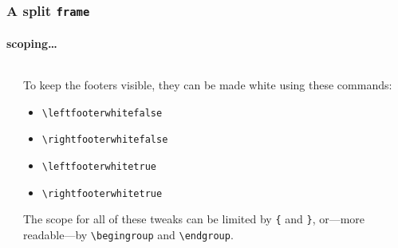 \begin{frame}%
  \frametitle{A split \texttt{frame}}%
  \framesubtitle{scoping\ldots}%
  \begin{columns}[T]
    \begin{textcolumn}
    \end{textcolumn}
    \begin{textcolumn}
      To keep the footers visible, they can be made white using these commands:
      \begin{itemize}
        \item \texttt{\textbackslash leftfooterwhitefalse}
        \item \texttt{\textbackslash rightfooterwhitefalse}
        \item \texttt{\textbackslash leftfooterwhitetrue}
        \item \texttt{\textbackslash rightfooterwhitetrue}
      \end{itemize}
      
      The scope for all of these tweaks can be limited by \texttt{\{} and \texttt{\}},
      or---more readable---by \texttt{\textbackslash begingroup} and \texttt{\textbackslash endgroup}.
    \end{textcolumn}
  \end{columns}
\end{frame}


\setlength{\splitpos}{-0.4\paperwidth}
\leftfooterwhitefalse

